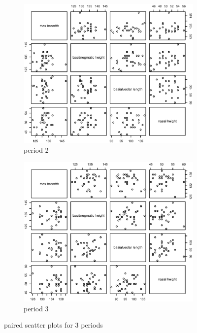 \documentclass{article}
\begin{document}
\begin{enumerate}[leftmargin = 0 em, label = \arabic*., font = \bfseries]
\begin{figure}[!htb]
\begin{subfigure}[b]{0.33\textwidth}
		\includegraphics[width = \textwidth]{scatter_2.eps}
		\caption{period 2}
		\end{subfigure}%
		\begin{subfigure}[b]{0.33\textwidth}
		\includegraphics[width = \textwidth]{scatter_3.eps}
		\caption{period 3}
		\end{subfigure}
		\caption{paired scatter plots for 3 periods}
		\label{scatter}
	\end{figure}
	\begin{figure}[!htb]
	    \centering
		\begin{subfigure}[b]{0.33\textwidth}

\end{subfigure}
\end{figure}
\end{enumerate}
\end{document}
